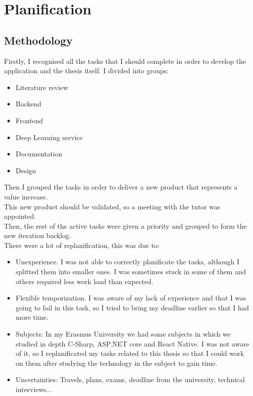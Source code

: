 \chapter{Planification}

\section{Methodology}
Firstly, I recognised all the tasks that I should complete in order to develop the application and the thesis itself. I divided into groups:
\begin{itemize}
    \item Literature review
    \item Backend
    \item Frontend
    \item Deep Learning service
    \item Documentation
    \item Design
\end{itemize}

Then I grouped the tasks in order to deliver a new product that represents a value increase. \\
This new product should be validated, so a meeting with the tutor was appointed. \\
Then, the rest of the active tasks were given a priority and grouped to form the new iteration backlog. \\
There were a lot of replanification, this was due to:
\begin{itemize}
    \item Unexperience. I was not able to correctly planificate the tasks, although I splitted them into smaller ones. I was sometimes stuck in some of them and others required less work load than expected.
    \item Flexible temporization. I was aware of my lack of experience and that I was going to fail in this task, so I tried to bring my deadline earlier so that I had more time.
    \item Subjects: In my Erasmus University we had some subjects in which we studied in depth C-Sharp, ASP.NET core and React Native. I was not aware of it, so I replanificated my tasks related to this thesis so that I could work on them after studying the technology in the subject to gain time.
    \item Uncertainties: Travels, plans, exams, deadline from the university, technical interviews...
\end{itemize}

